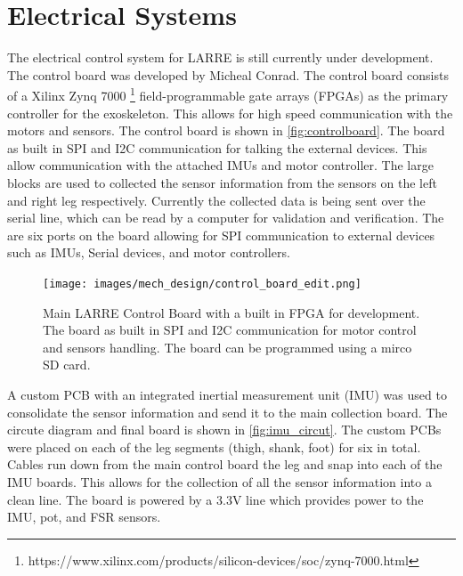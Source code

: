 \section{Electrical Systems}

The electrical control system for LARRE is still currently under development. The control board was developed by Micheal Conrad. The control board consists of a  Xilinx Zynq 7000 \footnote{https://www.xilinx.com/products/silicon-devices/soc/zynq-7000.html}  field-programmable gate arrays (FPGAs) as the primary controller for the exoskeleton. This allows for high speed communication with the motors and sensors. The control board is shown in \autoref{fig:controlboard}. The board as built in SPI and I2C communication for talking the external devices. This allow communication with the attached IMUs and motor controller. The large blocks are used to collected the sensor information from the sensors on the left and right leg respectively. Currently the collected data is being sent over the serial line, which can be read by a computer for validation and verification. The are six ports on the board allowing for SPI communication to external devices such as IMUs, Serial devices, and motor controllers. 


\begin{figure}
    \centering
    \texttt{[image: images/mech\_design/control\_board\_edit.png]}
    \caption[LARRE Control Board]{Main LARRE Control Board with a built in FPGA for development. The board as built in SPI and I2C communication for motor control and sensors handling. The board can be programmed using a mirco SD card. }
    \label{fig:controlboard}
\end{figure}


A custom PCB with an integrated inertial measurement unit (IMU) was used to consolidate the sensor information and send it to the main collection board. The circute diagram and final board is shown in \autoref{fig:imu_circut}. The custom PCBs were placed on each of the leg segments (thigh, shank, foot) for six in total. Cables run down from the main control board the leg and snap into each of the IMU boards.  This allows for the collection of all the sensor information into a clean line. The board is powered by a 3.3V line which provides power to the IMU, pot, and FSR sensors.


